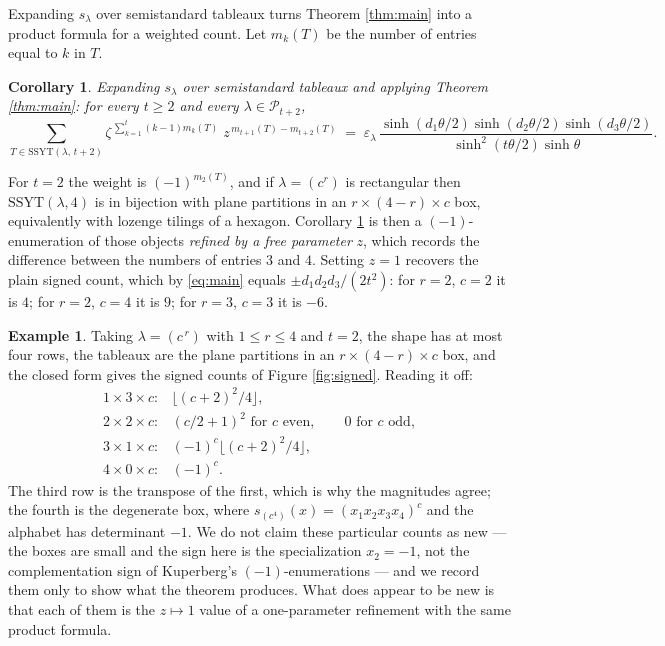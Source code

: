 \documentclass[11pt,reqno]{amsart}
\theoremstyle{plain}
\newtheorem{corollary}[theorem]{Corollary}
\theoremstyle{definition}
\newtheorem{example}[theorem]{Example}
\newcommand{\PP}{\mathcal{P}}
\begin{document}
Expanding $s_\lambda$ over semistandard tableaux turns Theorem \ref{thm:main} into a product formula
for a weighted count. Let $m_k(T)$ be the number of entries equal to $k$ in $T$.

\begin{corollary}\label{cor:enum}
Expanding $s_\lambda$ over semistandard tableaux and applying Theorem \ref{thm:main}: for every
$t\ge2$ and every $\lambda\in\PP_{t+2}$,
\[
\sum_{T\in\mathrm{SSYT}(\lambda,\,t+2)}
\zeta^{\,\sum_{k=1}^{t}(k-1)m_k(T)}\;z^{\,m_{t+1}(T)-m_{t+2}(T)}
\;=\;\varepsilon_\lambda\,
\frac{\sinh(d_1\theta/2)\sinh(d_2\theta/2)\sinh(d_3\theta/2)}{\sinh^2(t\theta/2)\sinh\theta}.
\]
\end{corollary}

For $t=2$ the weight is $(-1)^{m_2(T)}$, and if $\lambda=(c^r)$ is rectangular then
$\mathrm{SSYT}(\lambda,4)$ is in bijection with plane partitions in an $r\times(4-r)\times c$ box,
equivalently with lozenge tilings of a hexagon. Corollary \ref{cor:enum} is then a
$(-1)$-enumeration of those objects \emph{refined by a free parameter} $z$, which records the
difference between the numbers of entries $3$ and $4$. Setting $z=1$ recovers the plain signed
count, which by \eqref{eq:main} equals $\pm d_1d_2d_3/(2t^2)$: for $r=2$, $c=2$ it is $4$; for
$r=2$, $c=4$ it is $9$; for $r=3$, $c=3$ it is $-6$.

\begin{example}\label{ex:boxes}
Taking $\lambda=(c^{\,r})$ with $1\le r\le4$ and $t=2$, the shape has at most four rows, the tableaux
are the plane partitions in an $r\times(4-r)\times c$ box, and the closed form gives the signed
counts of Figure \ref{fig:signed}. Reading it off:
\[
\begin{array}{ll}
1\times3\times c: & \bigl\lfloor (c+2)^2/4\bigr\rfloor,\\[2pt]
2\times2\times c: & (c/2+1)^2 \text{ for } c \text{ even},\qquad 0 \text{ for } c \text{ odd},\\[2pt]
3\times1\times c: & (-1)^c\bigl\lfloor (c+2)^2/4\bigr\rfloor,\\[2pt]
4\times0\times c: & (-1)^c .
\end{array}
\]
The third row is the transpose of the first, which is why the magnitudes agree; the fourth is the
degenerate box, where $s_{(c^4)}(x)=(x_1x_2x_3x_4)^c$ and the alphabet has determinant $-1$. We do
not claim these particular counts as new --- the boxes are small and the sign here is the
specialization $x_2=-1$, not the complementation sign of Kuperberg's $(-1)$-enumerations --- and we
record them only to show what the theorem produces. What does appear to be new is that each of them
is the $z\mapsto1$ value of a one-parameter refinement with the same product formula.
\end{example}
\end{document}
